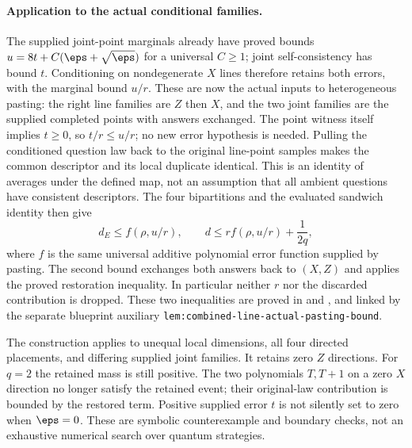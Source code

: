 \documentclass[11pt]{article}
\begin{document}
\paragraph{Application to the actual conditional families.}
The supplied joint-point marginals already have proved bounds
$u=8t+C(\eps+\sqrt\eps)$ for a universal $C\ge1$; joint self-consistency
has bound $t$. Conditioning on nondegenerate $X$ lines therefore retains
both errors, with the marginal bound $u/r$. These are now the actual inputs
to heterogeneous pasting: the right line families are $Z$ then $X$, and
the two joint families are the supplied completed points with answers
exchanged. The point witness itself implies $t\ge0$, so $t/r\le u/r$;
no new error hypothesis is needed. Pulling the conditioned question law back
to the original line-point samples makes the common descriptor and its
local duplicate identical. This is an identity of averages under the defined
map, not an assumption that all ambient questions have consistent descriptors.
The four bipartitions and the evaluated sandwich identity then give
\[
 d_E\le f(\rho,u/r),\qquad
 d\le r f(\rho,u/r)+\frac1{2q},
\]
where $f$ is the same universal additive polynomial error function supplied
by pasting. The second bound exchanges both answers back to $(X,Z)$ and
applies the proved restoration inequality. In particular neither $r$ nor
the discarded contribution is dropped. These two inequalities are proved in
 and
, and linked
by the separate blueprint auxiliary
\texttt{lem:combined-line-actual-pasting-bound}.

The construction applies to unequal local dimensions, all four directed
placements, and differing supplied joint families. It retains zero $Z$
directions. For $q=2$ the retained mass is still positive. The two
polynomials $T,T+1$ on a zero $X$ direction no longer satisfy the retained
event; their original-law contribution is bounded by the restored term.
Positive supplied error $t$ is not silently set to zero when $\eps=0$.
These are symbolic counterexample and boundary checks, not an exhaustive
numerical search over quantum strategies.
\end{document}
